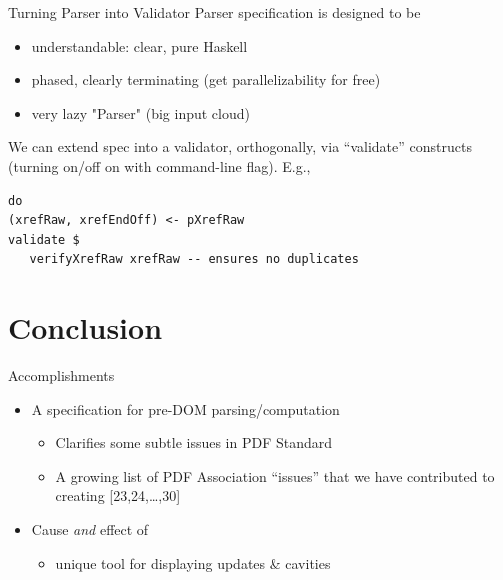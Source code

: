 \documentclass[t,10pt,xcolor={dvipsnames}]{beamer}
\begin{document}
\begin{frame}[label={sec:org8cccb32},fragile]{Turning Parser into Validator}
 Parser specification is designed to be
\begin{itemize}
\item understandable: clear, pure Haskell
\item phased, clearly terminating (get parallelizability for free)
\item very lazy "Parser" (big input cloud)
\end{itemize}

We can extend spec into a validator, orthogonally, via “validate” constructs
(turning on/off on with command-line flag).  E.g.,
\lstset{language=haskell,label= ,caption= ,captionpos=b,numbers=none}
\begin{lstlisting}
do
(xrefRaw, xrefEndOff) <- pXrefRaw
validate $
   verifyXrefRaw xrefRaw -- ensures no duplicates
\end{lstlisting}
\end{frame}

\section{Conclusion}
\label{sec:org8e8533a}
\begin{frame}[label={sec:org9974e49}]{Accomplishments}
\begin{itemize}
\item A specification for pre-DOM parsing/computation
\begin{itemize}
\item Clarifies some subtle issues in PDF Standard
\item A growing list of PDF Association “issues” that we have contributed to
creating [23,24,\ldots{},30]
\end{itemize}
\item Cause \emph{and} effect of
\begin{itemize}
\item unique tool for displaying updates \& cavities
\end{itemize}
\end{itemize}
\end{frame}
\end{document}
